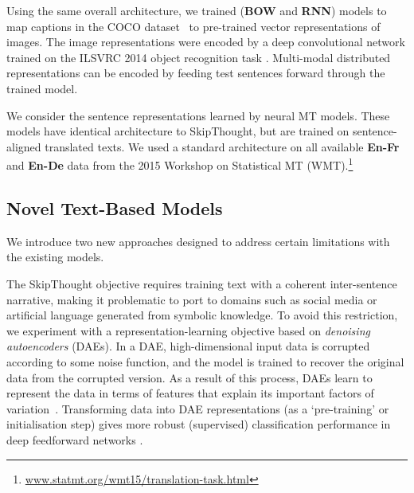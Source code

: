 \documentclass[11pt,letterpaper]{article}
\begin{document}
\vspace{5pt} Using the same overall architecture, we trained ({\bf BOW} and {\bf RNN}) models to map captions in the COCO dataset~\cite{chen2015microsoft} to pre-trained vector representations of images. The image representations were encoded by a deep convolutional network \cite{szegedy2014going} trained on the ILSVRC 2014 object recognition task \cite{russakovsky2014imagenet}. Multi-modal distributed representations can be encoded by feeding test sentences forward through the trained model. 

\vspace{5pt} We consider the sentence representations learned by neural MT models. These models have identical architecture to SkipThought, but are trained on sentence-aligned translated texts. We used a standard architecture \cite{cho2014learning} on all available {\bf En-Fr} and {\bf En-De} data from the 2015 Workshop on Statistical MT (WMT).\footnote{\scriptsize \url{www.statmt.org/wmt15/translation-task.html}} 

\subsection{Novel Text-Based Models}
We introduce two new approaches designed to address certain limitations with the existing models.

\vspace{5pt} The SkipThought objective requires training text with a coherent inter-sentence narrative, making it problematic to port to domains such as social media or artificial language generated from symbolic knowledge. To avoid this restriction, we experiment with a representation-learning objective based on \emph{denoising autoencoders} (DAEs). In a DAE, high-dimensional input data is corrupted according to some noise function, and the model is trained to recover the original data from the corrupted version. As a result of this process, DAEs learn to represent the data in terms of features that explain its important factors of variation~\cite{vincent2008extracting}. Transforming data into DAE representations (as a `pre-training' or initialisation step) gives more robust (supervised) classification performance in deep feedforward networks \cite{vincent2010stacked}.
\end{document}

